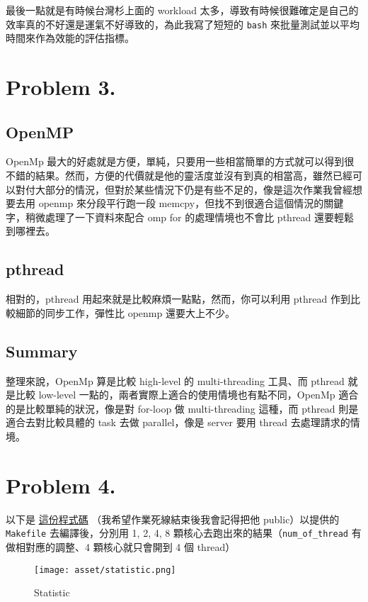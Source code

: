 \documentclass[12pt, a4paper]{article}
\begin{document}
最後一點就是有時候台灣杉上面的 workload 太多，導致有時候很難確定是自己的效率真的不好還是運氣不好導致的，為此我寫了短短的 \lstinline{bash} 來批量測試並以平均時間來作為效能的評估指標。
\section*{Problem 3.}
\subsection*{OpenMP}
OpenMp 最大的好處就是方便，單純，只要用一些相當簡單的方式就可以得到很不錯的結果。然而，方便的代價就是他的靈活度並沒有到真的相當高，雖然已經可以對付大部分的情況，但對於某些情況下仍是有些不足的，像是這次作業我曾經想要去用 openmp 來分段平行跑一段 memcpy，但找不到很適合這個情況的關鍵字，稍微處理了一下資料來配合 omp for 的處理情境也不會比 pthread 還要輕鬆到哪裡去。

\subsection*{pthread}
相對的，pthread 用起來就是比較麻煩一點點，然而，你可以利用 pthread 作到比較細節的同步工作，彈性比 openmp 還要大上不少。

\subsection*{Summary}
整理來說，OpenMp 算是比較 high-level 的 multi-threading 工具、而 pthread 就是比較 low-level 一點的，兩者實際上適合的使用情境也有點不同，OpenMp 適合的是比較單純的狀況，像是對 for-loop 做 multi-threading 這種，而 pthread 則是適合去對比較具體的 task 去做 parallel，像是 server 要用 thread 去處理請求的情境。
\newpage
\section*{Problem 4.}
以下是 \href{https://github.com/seanhuang1228/pp_hw1/blob/c368725ae0977416a67633079d386f397be79fec/setting1.cpp}{這份程式碼} （我希望作業死線結束後我會記得把他 public）以提供的 \lstinline{Makefile} 去編譯後，分別用 1, 2, 4, 8 顆核心去跑出來的結果（\lstinline{num_of_thread} 有做相對應的調整、4 顆核心就只會開到 4 個 thread）

\begin{figure}[h]
  \begin{center}
    \texttt{[image: asset/statistic.png]}
  \end{center}
  \caption{Statistic}
\end{figure}
\end{document}
